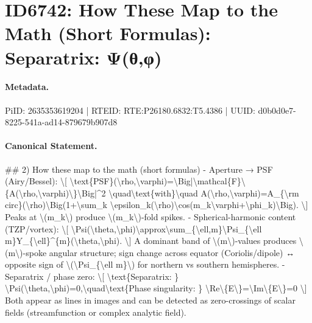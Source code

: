 \section*{ID6742: How These Map to the Math (Short Formulas): Separatrix: Ψ(θ,φ)}
\paragraph{Metadata.}
PiID: 2635353619204 | RTEID: RTE:P26180.6832:T5.4386 | UUID: d0b0d0e7-8225-541a-ad14-879679b907d8

\paragraph{Canonical Statement.}
\#\# 2) How these map to the math (short formulas) - Aperture → PSF (Airy/Bessel): \textbackslash{}[ \textbackslash{}text\{PSF\}(\textbackslash{}rho,\textbackslash{}varphi)=\textbackslash{}Big|\textbackslash{}mathcal\{F\}\textbackslash{}\{A(\textbackslash{}rho,\textbackslash{}varphi)\textbackslash{}\}\textbackslash{}Big|\textasciicircum{}2 \textbackslash{}quad\textbackslash{}text\{with\}\textbackslash{}quad A(\textbackslash{}rho,\textbackslash{}varphi)=A\_\{\textbackslash{}rm circ\}(\textbackslash{}rho)\textbackslash{}Big(1+\textbackslash{}sum\_k \textbackslash{}epsilon\_k(\textbackslash{}rho)\textbackslash{}cos(m\_k\textbackslash{}varphi+\textbackslash{}phi\_k)\textbackslash{}Big). \textbackslash{}] Peaks at \textbackslash{}(m\_k\textbackslash{}) produce \textbackslash{}(m\_k\textbackslash{})-fold spikes. - Spherical-harmonic content (TZP/vortex): \textbackslash{}[ \textbackslash{}Psi(\textbackslash{}theta,\textbackslash{}phi)\textbackslash{}approx\textbackslash{}sum\_\{\textbackslash{}ell,m\}\textbackslash{}Psi\_\{\textbackslash{}ell m\}Y\_\{\textbackslash{}ell\}\textasciicircum{}\{m\}(\textbackslash{}theta,\textbackslash{}phi). \textbackslash{}] A dominant band of \textbackslash{}(m\textbackslash{})-values produces \textbackslash{}(m\textbackslash{})-spoke angular structure; sign change across equator (Coriolis/dipole) ↔ opposite sign of \textbackslash{}(\textbackslash{}Psi\_\{\textbackslash{}ell m\}\textbackslash{}) for northern vs southern hemispheres. - Separatrix / phase zero: \textbackslash{}[ \textbackslash{}text\{Separatrix: \} \textbackslash{}Psi(\textbackslash{}theta,\textbackslash{}phi)=0,\textbackslash{}quad\textbackslash{}text\{Phase singularity: \} \textbackslash{}Re\textbackslash{}\{E\textbackslash{}\}=\textbackslash{}Im\textbackslash{}\{E\textbackslash{}\}=0 \textbackslash{}] Both appear as lines in images and can be detected as zero-crossings of scalar fields (streamfunction or complex analytic field).

